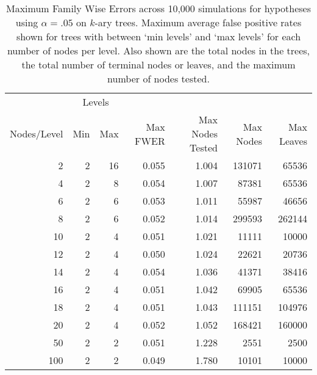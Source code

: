 \begin{table}[ht]
\centering
\begin{tabular}{rrrrrrr}
  \toprule
  &\multicolumn{2}{c}{Levels}\\ Nodes/Level & Min & Max & Max FWER & Max
  Nodes Tested & Max Nodes & Max Leaves \\ \midrule
   2 &    2 &   16 & 0.055 & 1.004 & 131071 & 65536 \\ 
     4 &    2 &    8 & 0.054 & 1.007 & 87381 & 65536 \\ 
     6 &    2 &    6 & 0.053 & 1.011 & 55987 & 46656 \\ 
     8 &    2 &    6 & 0.052 & 1.014 & 299593 & 262144 \\ 
    10 &    2 &    4 & 0.051 & 1.021 & 11111 & 10000 \\ 
    12 &    2 &    4 & 0.050 & 1.024 & 22621 & 20736 \\ 
    14 &    2 &    4 & 0.054 & 1.036 & 41371 & 38416 \\ 
    16 &    2 &    4 & 0.051 & 1.042 & 69905 & 65536 \\ 
    18 &    2 &    4 & 0.051 & 1.043 & 111151 & 104976 \\ 
    20 &    2 &    4 & 0.052 & 1.052 & 168421 & 160000 \\ 
    50 &    2 &    2 & 0.051 & 1.228 & 2551 & 2500 \\ 
   100 &    2 &    2 & 0.049 & 1.780 & 10101 & 10000 \\ 
   \bottomrule
\end{tabular}
\caption{Maximum Family Wise Errors across 10,000
  simulations for hypotheses using $\alpha=.05$ on $k$-ary trees. Maximum
  average false positive rates shown for trees with between `min levels' and
  `max levels' for each number of nodes per level. Also shown are the total
  nodes in the trees, the total number of terminal nodes or leaves, and the
  maximum number of nodes tested.} 
\label{tab:weak_control_sim}
\end{table}
